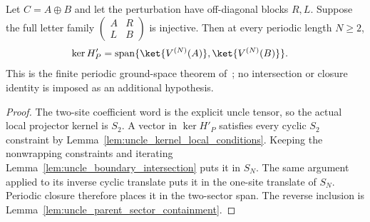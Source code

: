 \begin{theorem}
    \label{thm:uncle_periodic_ground_space}
    \leanok
    Let $C=A\oplus B$ and let the perturbation have off-diagonal blocks
    $R,L$. Suppose the full letter family
    $\left(\begin{smallmatrix}A&R\\L&B\end{smallmatrix}\right)$ is injective.
    Then at every periodic length $N\ge2$,
    \begin{align}
        \ker H'_P
         & =\operatorname{span}\{\ket{V^{(N)}(A)},\ket{V^{(N)}(B)}\}.
    \end{align}
    This is the finite periodic ground-space theorem
    of~\cite{FernandezGonzalez2015Uncle}; no intersection or closure identity
    is imposed as an additional hypothesis.
\end{theorem}
\begin{proof}\leanok
    The two-site coefficient word is the explicit uncle tensor, so the
    actual local projector kernel is $S_2$. A vector in $\ker H'_P$
    satisfies every cyclic $S_2$ constraint by
    Lemma~\ref{lem:uncle_kernel_local_conditions}. Keeping the nonwrapping
    constraints and iterating Lemma~\ref{lem:uncle_boundary_intersection}
    puts it in $S_N$. The same argument applied to its inverse cyclic
    translate puts it in the one-site translate of $S_N$. Periodic closure
    therefore places it in the two-sector span. The reverse inclusion is
    Lemma~\ref{lem:uncle_parent_sector_containment}.
\end{proof}
